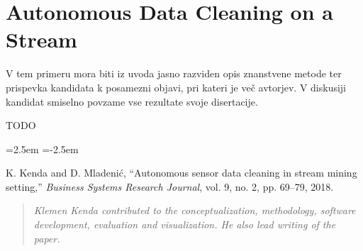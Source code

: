 % 
\chapter{Autonomous Data Cleaning on a Stream}
\label{ch:data-cleaning}

V tem primeru mora biti iz uvoda jasno razviden opis znanstvene metode ter prispevka kandidata k posamezni objavi, pri kateri je več avtorjev. V diskusiji kandidat smiselno povzame vse rezultate svoje disertacije.

TODO

\begin{list}{}
{\leftmargin=2.5em \itemindent=-2.5em}
    \item K. Kenda and D. Mladenić, “Autonomous sensor data cleaning in stream mining setting,” \textit{Business Systems Research Journal}, vol. 9, no. 2, pp. 69–79, 2018.
\end{list}


\begin{quote}
    \textit{Klemen Kenda contributed to the conceptualization, methodology, software development, evaluation and visualization. He also lead writing of the paper.}
\end{quote}


